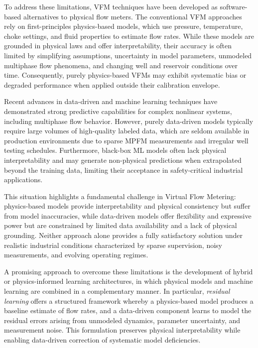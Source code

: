 \documentclass[12pt,APA]{uomthesis}
\begin{document}
To address these limitations, VFM techniques have been developed as software-based alternatives to physical flow meters. The conventional VFM approaches rely on first-principles physics-based models, which use pressure, temperature, choke settings, and fluid properties to estimate flow rates. While these models are grounded in physical laws and offer interpretability, their accuracy is often limited by simplifying assumptions, uncertainty in model parameters, unmodeled multiphase flow phenomena, and changing well and reservoir conditions over time. Consequently, purely physics-based VFMs may exhibit systematic bias or degraded performance when applied outside their calibration envelope.

Recent advances in data-driven and machine learning techniques have demonstrated strong predictive capabilities for complex nonlinear systems, including multiphase flow behavior. However, purely data-driven models typically require large volumes of high-quality labeled data, which are seldom available in production environments due to sparse MPFM measurements and irregular well testing schedules. Furthermore, black-box ML models often lack physical interpretability and may generate non-physical predictions when extrapolated beyond the training data, limiting their acceptance in safety-critical industrial applications.

This situation highlights a fundamental challenge in Virtual Flow Metering: physics-based models provide interpretability \citep{karniadakis2021physics} and physical consistency but suffer from model inaccuracies, while data-driven models offer flexibility and expressive power but are constrained by limited data availability and a lack of physical grounding. Neither approach alone provides a fully satisfactory solution under realistic industrial conditions characterized by sparse supervision, noisy measurements, and evolving operating regimes.

A promising approach to overcome these limitations is the development of hybrid or physics-informed learning architectures, in which physical models and machine learning are combined in a complementary manner. In particular, \textit{residual learning} offers a structured framework whereby a physics-based model produces a baseline estimate of flow rates, and a data-driven component learns to model the residual errors arising from unmodeled dynamics, parameter uncertainty, and measurement noise. This formulation preserves physical interpretability while enabling data-driven correction of systematic model deficiencies.
\end{document}

